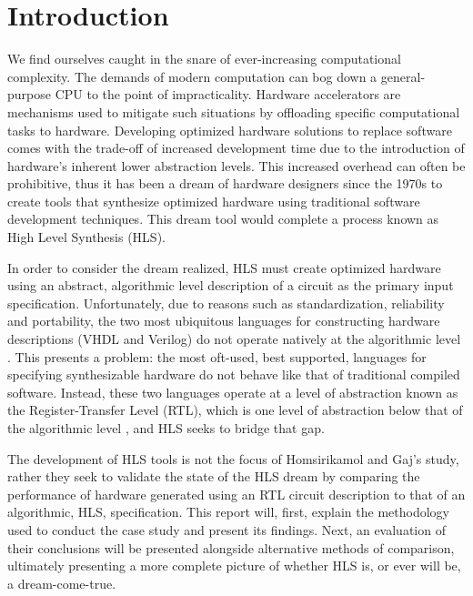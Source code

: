 \documentclass[twocolumn]{article}
\begin{document}
\section{Introduction}

We find ourselves caught in the snare of ever-increasing computational complexity. The demands of modern computation can bog down a general-purpose CPU to the point of impracticality\cite{skalicky}. Hardware accelerators are mechanisms used to mitigate such situations by offloading specific computational tasks to hardware. Developing optimized hardware solutions to replace software comes with the trade-off of increased development time due to the introduction of hardware's inherent lower abstraction levels. This increased overhead can often be prohibitive, thus it has been a dream of hardware designers since the 1970s to create tools that synthesize optimized hardware using traditional software development techniques\cite{1}. This dream tool would complete a process known as High Level Synthesis (HLS).

In order to consider the dream realized, HLS must create optimized hardware using an abstract, algorithmic level description of a circuit as the primary input specification\cite{mcfarland}. Unfortunately, due to reasons such as standardization\cite{ieee}, reliability\cite{tosun} and portability\cite{churtl}, the two most ubiquitous languages for constructing hardware descriptions (VHDL and Verilog) do not operate natively at the algorithmic level \cite{Harris+Harris}. This presents a problem: the most oft-used, best supported, languages for specifying synthesizable hardware do not behave like that of traditional compiled software. Instead, these two languages operate at a level of abstraction known as the Register-Transfer Level (RTL), which is one level of abstraction below that of the algorithmic level \cite{vahid}, and HLS seeks to bridge that gap.

The development of HLS tools is not the focus of Homsirikamol and Gaj's study, rather they seek to validate the state of the HLS dream by comparing the performance of hardware generated using an RTL circuit description to that of an algorithmic, HLS, specification. This report will, first, explain the methodology used to conduct the case study and present its findings. Next, an evaluation of their conclusions will be presented alongside alternative methods of comparison, ultimately presenting a more complete picture of whether HLS is, or ever will be, a dream-come-true.
\end{document}
